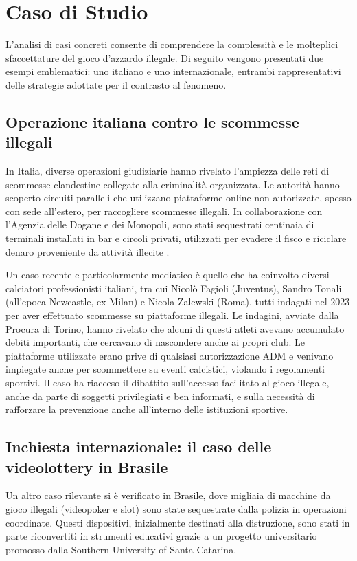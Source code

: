 \documentclass[a4paper,12pt]{article}
\begin{document}
\section{Caso di Studio}

L’analisi di casi concreti consente di comprendere la complessità e le molteplici sfaccettature del gioco d’azzardo illegale. Di seguito vengono presentati due esempi emblematici: uno italiano e uno internazionale, entrambi rappresentativi delle strategie adottate per il contrasto al fenomeno.

\subsection{Operazione italiana contro le scommesse illegali}
In Italia, diverse operazioni giudiziarie hanno rivelato l’ampiezza delle reti di scommesse clandestine collegate alla criminalità organizzata. Le autorità hanno scoperto circuiti paralleli che utilizzano piattaforme online non autorizzate, spesso con sede all’estero, per raccogliere scommesse illegali. In collaborazione con l’Agenzia delle Dogane e dei Monopoli, sono stati sequestrati centinaia di terminali installati in bar e circoli privati, utilizzati per evadere il fisco e riciclare denaro proveniente da attività illecite \cite{lucchini2022socialcosts}.

Un caso recente e particolarmente mediatico è quello che ha coinvolto diversi calciatori professionisti italiani, tra cui Nicolò Fagioli (Juventus), Sandro Tonali (all’epoca Newcastle, ex Milan) e Nicola Zalewski (Roma), tutti indagati nel 2023 per aver effettuato scommesse su piattaforme illegali. Le indagini, avviate dalla Procura di Torino, hanno rivelato che alcuni di questi atleti avevano accumulato debiti importanti, che cercavano di nascondere anche ai propri club. Le piattaforme utilizzate erano prive di qualsiasi autorizzazione ADM e venivano impiegate anche per scommettere su eventi calcistici, violando i regolamenti sportivi. Il caso ha riacceso il dibattito sull’accesso facilitato al gioco illegale, anche da parte di soggetti privilegiati e ben informati, e sulla necessità di rafforzare la prevenzione anche all’interno delle istituzioni sportive.

\subsection{Inchiesta internazionale: il caso delle videolottery in Brasile}

Un altro caso rilevante si è verificato in Brasile, dove migliaia di macchine da gioco illegali (videopoker e slot) sono state sequestrate dalla polizia in operazioni coordinate. Questi dispositivi, inizialmente destinati alla distruzione, sono stati in parte riconvertiti in strumenti educativi grazie a un progetto universitario promosso dalla Southern University of Santa Catarina.
\end{document}
